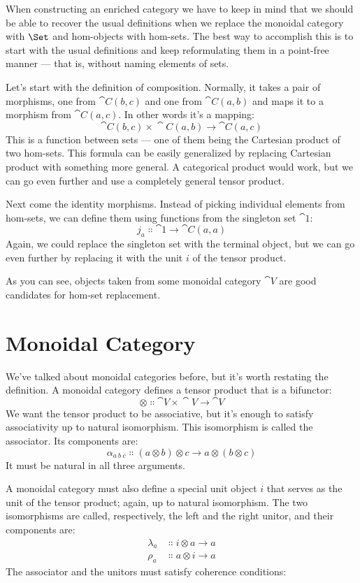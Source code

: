 When constructing an enriched category we have to keep in mind that we
should be able to recover the usual definitions when we replace the
monoidal category with $\Set$ and hom-objects with hom-sets. The
best way to accomplish this is to start with the usual definitions and
keep reformulating them in a point-free manner --- that is, without
naming elements of sets.

Let's start with the definition of composition. Normally, it takes a
pair of morphisms, one from $\cat{C}(b, c)$ and one from
$\cat{C}(a, b)$ and maps it to a morphism from $\cat{C}(a, c)$. In
other words it's a mapping:
\[\cat{C}(b, c)\times{}\cat{C}(a, b) \to \cat{C}(a, c)\]
This is a function between sets --- one of them being the Cartesian
product of two hom-sets. This formula can be easily generalized by
replacing Cartesian product with something more general. A categorical
product would work, but we can go even further and use a completely
general tensor product.

Next come the identity morphisms. Instead of picking individual elements
from hom-sets, we can define them using functions from the singleton set
$\cat{1}$:
\[j_a \Colon \cat{1} \to \cat{C}(a, a)\]
Again, we could replace the singleton set with the terminal object, but
we can go even further by replacing it with the unit $i$ of the
tensor product.

As you can see, objects taken from some monoidal category $\cat{V}$ are
good candidates for hom-set replacement.

\section{Monoidal Category}

We've talked about monoidal categories before, but it's worth restating
the definition. A monoidal category defines a tensor product that is a
bifunctor:
\[\otimes \Colon \cat{V}\times{}\cat{V} \to \cat{V}\]
We want the tensor product to be associative, but it's enough to satisfy
associativity up to natural isomorphism. This isomorphism is called the
associator. Its components are:
\[\alpha_{a\ b\ c} \Colon (a \otimes b) \otimes c \to a \otimes (b \otimes c)\]
It must be natural in all three arguments.

A monoidal category must also define a special unit object $i$
that serves as the unit of the tensor product; again, up to natural
isomorphism. The two isomorphisms are called, respectively, the left and
the right unitor, and their components are:
\begin{align*}
\lambda_a &\Colon i \otimes a \to a \\
\rho_a &\Colon a \otimes i \to a
\end{align*}
The associator and the unitors must satisfy coherence conditions:

